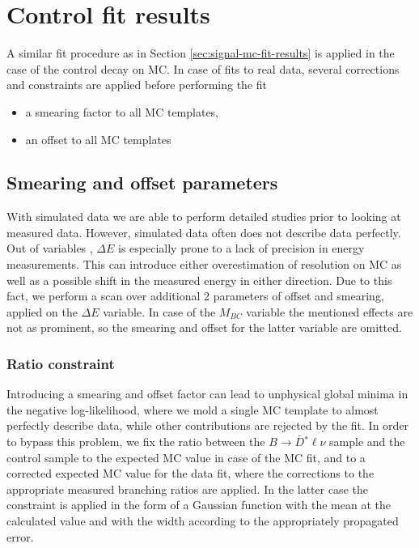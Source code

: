 \section{Control fit results}

A similar fit procedure as in Section \ref{sec:signal-mc-fit-results} is applied in the case of the control decay on MC. In case of fits to real data, several corrections and constraints are applied before performing the fit

\begin{itemize}
\item a smearing factor to all MC templates,
\item an offset to all MC templates
\end{itemize}

\subsection{Smearing and offset parameters}

With simulated data we are able to perform detailed studies prior to looking at measured data. However, simulated data often does not describe data perfectly. Out of variables \vars, $\Delta E$ is especially prone to a lack of precision in energy measurements. This can introduce either overestimation of resolution on MC as well as a possible shift in the measured energy in either direction. Due to this fact, we perform a scan over additional 2 parameters of offset and smearing, applied on the $\Delta E$ variable. In case of the $M_{BC}$ variable the mentioned effects are not as prominent, so the smearing and offset for the latter variable are omitted. 

\subsubsection{Ratio constraint}

Introducing a smearing and offset factor can lead to unphysical global minima in the negative log-likelihood, where we mold a single MC template to almost perfectly describe data, while other contributions are rejected by the fit. In order to bypass this problem, we fix the ratio between the  $B \to \bar D {}^* \ell \nu$ sample and the control sample to the expected MC value in case of the MC fit, and to a corrected expected MC value for the data fit, where the corrections to the appropriate measured branching ratios are applied. In the latter case the constraint is applied in the form of a Gaussian function with the mean at the calculated value and with the width according to the appropriately propagated error.


